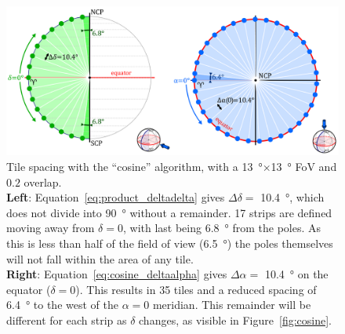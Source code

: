 \begin{colsection}
\begin{colsection}
\begin{figure}[p]
\begin{center}
\includegraphics[width=\linewidth]{images/spacing_cosine.pdf}
\end{center}
\caption[Tile spacing with the ``cosine'' algorithm]{Tile spacing with the ``cosine'' algorithm, with a \SI{13}{\degree}$\times$\SI{13}{\degree} FoV and $0.2$ overlap.
\\
\textbf{Left}: Equation~\ref{eq:product_deltadelta} gives $\Delta\delta = $ \SI{10.4}{\degree}, which does not divide into \SI{90}{\degree} without a remainder. 17 strips are defined moving away from $\delta=0$, with last being \SI{6.8}{\degree} from the poles. As this is less than half of the field of view (\SI{6.5}{\degree}) the poles themselves will not fall within the area of any tile.
\\
\textbf{Right}: Equation~\ref{eq:cosine_deltaalpha} gives $\Delta\alpha = $ \SI{10.4}{\degree} on the equator ($\delta=0$). This results in 35 tiles and a reduced spacing of \SI{6.4}{\degree} to the west of the $\alpha=0$ meridian. This remainder will be different for each strip as $\delta$ changes, as visible in Figure~\ref{fig:cosine}.
}
\label{fig:cosine_spacing}
\end{figure}


\end{colsection}
\end{colsection}

